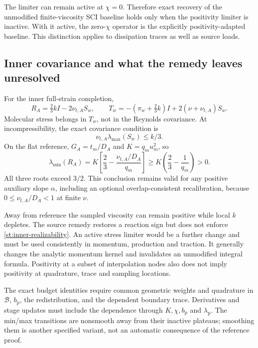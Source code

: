 \documentclass[11pt,a4paper]{article}
\numberwithin{equation}{section}
\begin{document}
The limiter can remain active at $\chi=0$. Therefore exact recovery
of the unmodified finite-viscosity SCI baseline holds only when
the positivity limiter is inactive. With it active, the zero-$\chi$
operator is the explicitly positivity-adapted baseline.
This distinction applies to dissipation traces as well as source
loads.

\subsection{Inner covariance and what the remedy leaves unresolved}
\label{st:inner-covariance}

For the inner full-strain completion,
\[
 R_A=\tfrac23kI-2\nu_{t,A}S_w,\qquad
 T_w=-(\pi_w+\tfrac23k)I+2(\nu+\nu_{t,A})S_w.
\]
Molecular stress belongs in $T_w$, not in the Reynolds covariance.
At incompressibility, the exact covariance condition is
\begin{equation}
 \boxed{\nu_{t,A}\lambda_{\max}(S_w)\le k/3.}
 \label{st:inner-realizability}
\end{equation}
On the flat reference, $G_A=t_m/D_A$ and $K=q_m u_m^2$, so
\begin{equation}
 \lambda_{\min}(R_A)
 =K\left[\frac23-\frac{\nu_{t,A}/D_A}{q_m}\right]
 \ge K\left(\frac23-\frac1{q_m}\right)>0.
 \label{st:inner-reference-covariance}
\end{equation}
All three roots exceed $3/2$. This conclusion remains valid for any
positive auxiliary slope $\alpha$, including an optional
overlap-consistent recalibration, because
$0\le\nu_{t,A}/D_A<1$ at finite $\nu$.

Away from reference the sampled viscosity can remain positive while
local $k$ depletes. The source remedy restores a reaction sign but
does not enforce \cref{st:inner-realizability}. An active stress
limiter would be a further change and must be used consistently
in momentum, production and traction. It generally changes the
analytic momentum kernel and invalidates an unmodified integral
formula. Positivity at a subset of interpolation nodes also does
not imply positivity at quadrature, trace and sampling locations.

The exact budget identities require common geometric weights and
quadrature in $\mathcal B$, $b_{\mathrm p}$, the redistribution,
and the dependent boundary trace. Derivatives and stage updates
must include the dependence through $K,\chi,b_{\mathrm p}$ and
$\lambda_{\mathrm p}$. The min/max transitions are nonsmooth away
from their inactive plateaus; smoothing them is another specified
variant, not an automatic consequence of the reference proof.
\end{document}
